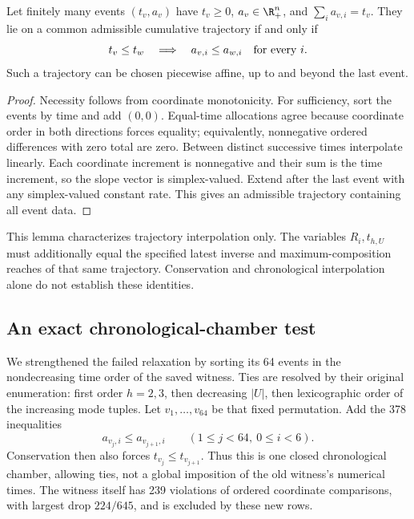 \begin{lemma}\label{lem:event-interpolation}
Let finitely many events $(t_v,a_v)$ have $t_v\ge0$, $a_v\in\R_+^n$,
and $\sum_i a_{v,i}=t_v$. They lie on a common admissible cumulative
trajectory if and only if
\begin{equation}\label{eq:chronological-order}
 t_v\le t_w\quad\Longrightarrow\quad a_{v,i}\le a_{w,i}
                    \quad\hbox{for every }i.
\end{equation}
Such a trajectory can be chosen piecewise affine, up to and beyond the
last event.
\end{lemma}
\begin{proof}
Necessity follows from coordinate monotonicity. For sufficiency, sort the
events by time and add $(0,0)$. Equal-time allocations agree because
coordinate order in both directions forces equality; equivalently,
nonnegative ordered differences with zero total are zero. Between distinct
successive times interpolate linearly. Each coordinate increment is
nonnegative and their sum is the time increment, so the slope vector is
simplex-valued. Extend after the last event with any simplex-valued constant
rate. This gives an admissible trajectory containing all event data.
\end{proof}

This lemma characterizes trajectory interpolation only. The variables
$R_i,t_{h,U}$ must additionally equal the specified latest inverse and
maximum-composition reaches of that same trajectory. Conservation and
chronological interpolation alone do not establish these identities.

\subsection{An exact chronological-chamber test}\label{subsec:chronological-test}

We strengthened the failed relaxation by sorting its 64 events in the
nondecreasing time order of the saved witness. Ties are resolved by their
original enumeration: first order $h=2,3$, then decreasing $|U|$, then
lexicographic order of the increasing mode tuples. Let $v_1,\ldots,v_{64}$
be that fixed permutation. Add the 378 inequalities
\begin{equation}\label{eq:chamber-cuts}
 a_{v_j,i}\le a_{v_{j+1},i}\qquad(1\le j<64,\ 0\le i<6).
\end{equation}
Conservation then also forces $t_{v_j}\le t_{v_{j+1}}$.
Thus this is one closed chronological chamber, allowing ties, not a
global imposition of the old witness's numerical times. The witness itself
has 239 violations of ordered coordinate comparisons, with largest drop
$224/645$, and is excluded by these new rows.

